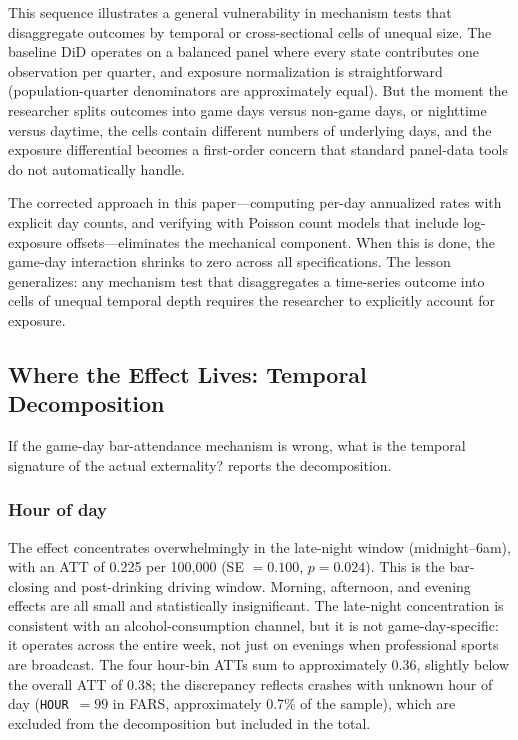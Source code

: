 \documentclass[12pt]{article}
\begin{document}
This sequence illustrates a general vulnerability in mechanism tests that disaggregate outcomes by temporal or cross-sectional cells of unequal size. The baseline DiD operates on a balanced panel where every state contributes one observation per quarter, and exposure normalization is straightforward (population-quarter denominators are approximately equal). But the moment the researcher splits outcomes into game days versus non-game days, or nighttime versus daytime, the cells contain different numbers of underlying days, and the exposure differential becomes a first-order concern that standard panel-data tools do not automatically handle.

The corrected approach in this paper---computing per-day annualized rates with explicit day counts, and verifying with Poisson count models that include log-exposure offsets---eliminates the mechanical component. When this is done, the game-day interaction shrinks to zero across all specifications. The lesson generalizes: any mechanism test that disaggregates a time-series outcome into cells of unequal temporal depth requires the researcher to explicitly account for exposure.

\subsection{Where the Effect Lives: Temporal Decomposition}



If the game-day bar-attendance mechanism is wrong, what is the temporal signature of the actual externality?  reports the decomposition.

\subsubsection*{Hour of day} The effect concentrates overwhelmingly in the late-night window (midnight--6am), with an ATT of 0.225 per 100,000 (SE $= 0.100$, $p = 0.024$). This is the bar-closing and post-drinking driving window. Morning, afternoon, and evening effects are all small and statistically insignificant. The late-night concentration is consistent with an alcohol-consumption channel, but it is not game-day-specific: it operates across the entire week, not just on evenings when professional sports are broadcast. The four hour-bin ATTs sum to approximately 0.36, slightly below the overall ATT of 0.38; the discrepancy reflects crashes with unknown hour of day (\texttt{HOUR}~$= 99$ in FARS, approximately 0.7\% of the sample), which are excluded from the decomposition but included in the total.
\end{document}
